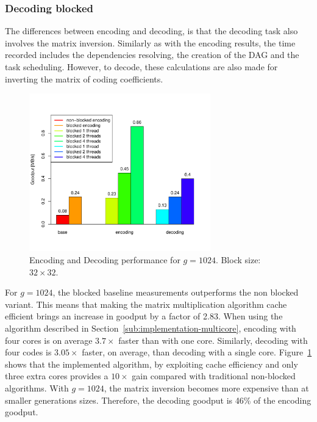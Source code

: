 \subsubsection{Decoding blocked}
The differences between encoding and decoding, is that the decoding task
also involves the matrix inversion. Similarly as with the encoding results,
the time recorded includes the dependencies resolving, the creation of the
\ac{DAG} and the task scheduling. However, to decode, these calculations
are also made for inverting the matrix of coding coefficients.

\begin{figure}[ht!]
\centering
\includegraphics[width=0.7\textwidth]{images/2015-04-18_encoding_decoding_1024.pdf}
\caption{Encoding and Decoding performance for $g = 1024$. Block size: $32 \times 32$. \cite{wunderlich2015network}}
\label{enc_dec1024}
\end{figure}

For $g= 1024$, the blocked baseline measurements outperforms the non blocked
variant. This means that making the matrix multiplication algorithm cache
efficient brings an increase in goodput by a factor of 2.83. When using the
algorithm described in Section~\ref{sub:implementation-multicore},
encoding with four cores is on average $3.7\times$ faster than with one core.
Similarly, decoding with four codes is $3.05\times$ faster, on average, than
decoding with a single core. Figure~\ref{enc_dec1024} shows that the
implemented algorithm, by exploiting cache efficiency and only three extra
cores provides a $10\times$ gain compared with traditional non-blocked
algorithms. With $g = 1024$, the matrix inversion becomes more expensive
than at smaller generations sizes. Therefore, the decoding goodput
is 46\% of the encoding goodput.

